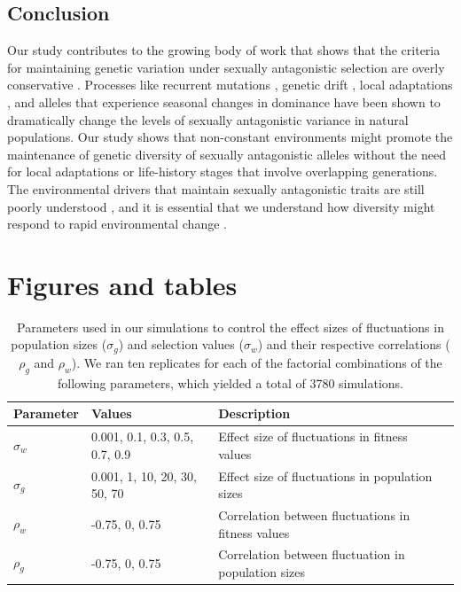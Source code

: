 \documentclass[12pt]{article}
\begin{document}
 \subsection*{Conclusion}

 Our study contributes to the growing body of work that shows that the criteria for maintaining genetic variation under sexually antagonistic selection are overly conservative \citep{connallon2012general,connallon_evolutionary_2018}. Processes like recurrent mutations \citep{radwan_maintenance_2008}, genetic drift \citep{connallon2012general}, local adaptations \citep{connallon_evolutionary_2018}, and alleles that experience seasonal changes in dominance \citep{wittmann2017seasonally} have been shown to dramatically change the levels of sexually antagonistic variance in natural populations. Our study shows that non-constant environments might promote the maintenance of genetic diversity of sexually antagonistic alleles without the need for local adaptations or life-history stages that involve overlapping generations. The environmental drivers that maintain sexually antagonistic traits are still poorly understood \citep{connallon2018environmental}, and it is essential that we understand how diversity might respond to rapid environmental change \citep{tylianakis2008global}.
 \clearpage

\clearpage
\section*{Figures and tables }


\begin{table}[h]
\fontsize{10}{18}\selectfont
\centering
\caption{Parameters used in our simulations to control the effect sizes of fluctuations in population sizes ($\sigma_{g}$) and selection values ($\sigma_{w}$) and their respective correlations ($\rho_{g}$ and $\rho_{w}$). We ran ten replicates for each of the factorial combinations of the following parameters, which yielded a total of 3780 simulations. }
\begin{tabular}{@{}llll@{}}
\toprule
Parameter                    & Values                    & Description                                   &  \\ \midrule
$\sigma_{w}$ & 0.001, 0.1, 0.3, 0.5, 0.7, 0.9 & Effect size of fluctuations in fitness values &  \\
$\sigma_{g}$ & 0.001, 1, 10, 20, 30, 50, 70 & Effect size of fluctuations in population sizes                                              &  \\
$\rho_{w}$  &  -0.75, 0, 0.75                         &   Correlation between fluctuations in fitness values                                            &  \\
$\rho_{g}$  &   -0.75, 0, 0.75                        &  Correlation between fluctuation in population sizes                                             &  \\ \bottomrule
\end{tabular}
\label{tab:fluctuations}
\end{table}
\end{document}
